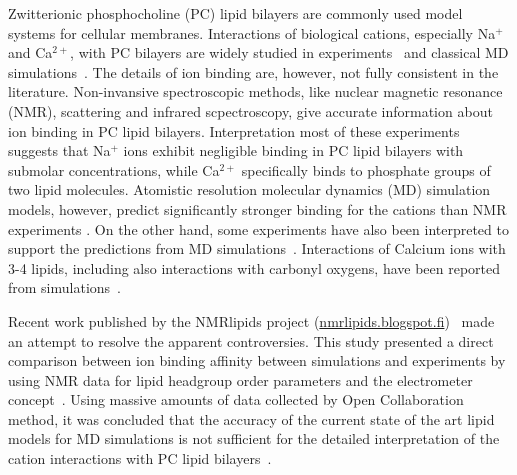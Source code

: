 \documentclass[aip,jcp,twocolumn]{revtex4}
\begin{document}
Zwitterionic phosphocholine (PC) lipid bilayers are commonly used model systems for
cellular membranes. Interactions of biological cations, especially Na$^+$ and
Ca$^{2+}$, with PC bilayers are widely studied in
experiments~\cite{akutsu81,altenbach84,seelig90,cevc90,tocanne90,binder02,pabst07,uhrikova08}
and classical MD simulations~\cite{bockmann03,bockmann04,Berkowitz12,melcrova16,javanainen17}.
The details of ion binding are, however, not fully consistent in the literature.
Non-invansive spectroscopic methods, like nuclear magnetic resonance (NMR), scattering
and infrared scpectroscopy, give accurate information about ion binding
in PC lipid bilayers\cite{hauser76,hauser78,herbette84,akutsu81,altenbach84,binder02,pabst07,uhrikova08}.
Interpretation most of these experiments suggests that Na$^+$ ions exhibit
negligible binding in PC lipid bilayers with submolar concentrations, while Ca$^{2+}$ specifically
binds to phosphate groups of two lipid molecules. Atomistic resolution
molecular dynamics (MD) simulation models, however, predict significantly
stronger binding for the cations than NMR experiments \cite{catte16}.
On the other hand, some experiments have also been interpreted to support the predictions from
MD simulations~\cite{bockmann03,vacha09a}. 
Interactions of Calcium ions with 3-4 lipids,
including also interactions with carbonyl
oxygens, have been reported from simulations~\cite{bockmann03,bockmann04,melcrova16,javanainen17}.


Recent work published by the NMRlipids project (\url{nmrlipids.blogspot.fi})~\cite{catte16}
made an attempt to resolve the apparent controversies. This study presented 
a direct comparison between ion binding affinity between simulations and
experiments by using NMR data for lipid headgroup order 
parameters and the electrometer concept~\cite{seelig87}.
Using massive amounts of data collected by Open Collaboration method, it was concluded
that the accuracy of the current state of the art lipid models for MD
simulations is not sufficient for the detailed interpretation of the cation
interactions with PC lipid bilayers~\cite{catte16}.
\end{document}
